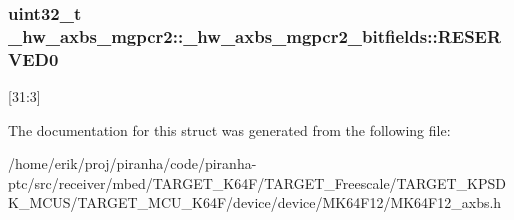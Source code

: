 \subsubsection[{\texorpdfstring{R\+E\+S\+E\+R\+V\+E\+D0}{RESERVED0}}]{\setlength{\rightskip}{0pt plus 5cm}uint32\+\_\+t \+\_\+hw\+\_\+axbs\+\_\+mgpcr2\+::\+\_\+hw\+\_\+axbs\+\_\+mgpcr2\+\_\+bitfields\+::\+R\+E\+S\+E\+R\+V\+E\+D0}\hypertarget{struct__hw__axbs__mgpcr2_1_1__hw__axbs__mgpcr2__bitfields_a1a928d1ce27f08802d49d438d9a0d394}{}\label{struct__hw__axbs__mgpcr2_1_1__hw__axbs__mgpcr2__bitfields_a1a928d1ce27f08802d49d438d9a0d394}
\mbox{[}31\+:3\mbox{]} 

The documentation for this struct was generated from the following file\+:\begin{DoxyCompactItemize}
\item 
/home/erik/proj/piranha/code/piranha-\/ptc/src/receiver/mbed/\+T\+A\+R\+G\+E\+T\+\_\+\+K64\+F/\+T\+A\+R\+G\+E\+T\+\_\+\+Freescale/\+T\+A\+R\+G\+E\+T\+\_\+\+K\+P\+S\+D\+K\+\_\+\+M\+C\+U\+S/\+T\+A\+R\+G\+E\+T\+\_\+\+M\+C\+U\+\_\+\+K64\+F/device/device/\+M\+K64\+F12/M\+K64\+F12\+\_\+axbs.\+h\end{DoxyCompactItemize}
